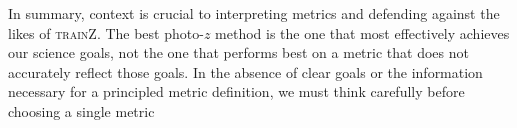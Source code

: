 \documentclass[usenatbib]{mn2e}
\newcommand{\trainz}{\textsc{trainZ}}
\newcommand{\red}[1]{\textcolor{red}{#1}}
\newcommand{\aim}[1]{\textcolor{green}{#1}}%
\begin{document}

In summary, context is crucial to interpreting metrics and defending against the likes of \trainz.
The best photo-$z$ method is the one that most effectively achieves our science goals, not the one that performs best on a metric that does not accurately reflect those goals.
In the absence of clear goals or the information necessary for a principled metric definition, we must think carefully before choosing a single metric

%
\end{document}
